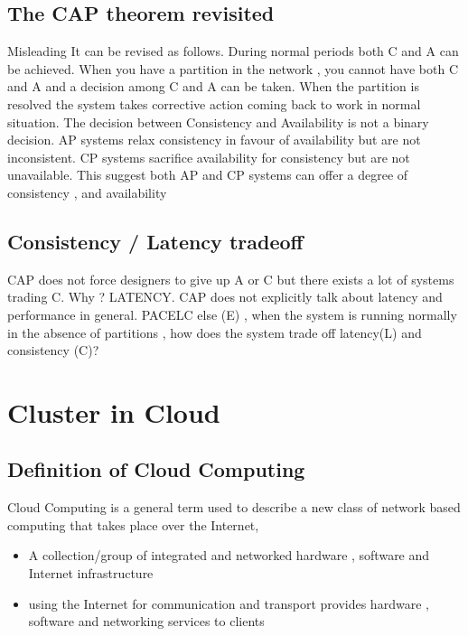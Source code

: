 \documentclass{article}
\begin{document}
\subsection{The CAP theorem revisited }
Misleading 
It can be revised as follows. During normal periods both C and A can be achieved. When you have a partition in the network , you cannot have both C and A and a decision among C and A can be taken. When the partition is resolved the system takes corrective action coming back to work in normal situation.
The decision between Consistency and Availability is not a binary decision. 
AP systems relax consistency in favour of availability but are not inconsistent.
CP systems sacrifice availability for consistency but are not unavailable.
This suggest both AP and CP systems can offer a degree of consistency , and availability 

\subsection{Consistency / Latency tradeoff}
CAP does not force designers to give up A or C but there exists a lot of systems trading C. Why ? LATENCY.
CAP does not explicitly talk about latency and performance in general.
PACELC 
else (E) , when the system is running normally in the absence of partitions , how does the system trade off latency(L) and consistency (C)? 


\section{Cluster in Cloud}
\subsection{Definition of Cloud Computing}
Cloud Computing is a general term used to describe a new class of network based computing that takes place over the Internet, 
\begin{itemize}
    \item A collection/group of integrated and networked hardware , software and Internet infrastructure
    \item using the Internet for communication and transport provides hardware , software and networking services to clients
\end{itemize}
\end{document}
